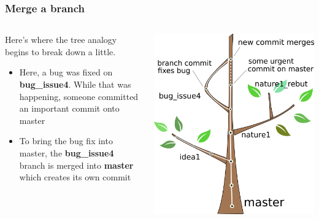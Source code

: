 \documentclass{beamer}
\begin{document}
\begin{frame}
  \frametitle{Merge a branch}
  \begin{columns}[T]
    \begin{column}{.5\textwidth}
      Here's where the tree analogy begins to break down a little.
      \begin{itemize}
      \item Here, a bug was fixed on \textbf{bug\_issue4}. While that was
        happening, someone committed an important commit onto master
      \item To bring the bug fix into master, the \textbf{bug\_issue4}
        branch is \alert{merged} into \textbf{master} which creates its own
        commit
      \end{itemize}
    \end{column}
    \begin{column}{.5\textwidth}
      \includegraphics[width=\textwidth]{tree_merge.png}
    \end{column}
  \end{columns}
\end{frame}
\end{document}
